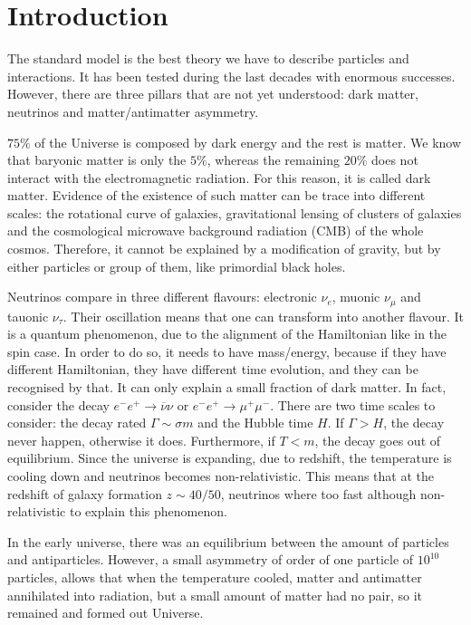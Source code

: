 \chapter*{Introduction}

    The standard model is the best theory we have to describe particles and interactions. It has been tested during the last decades with enormous successes. However, there are three pillars that are not yet understood: dark matter, neutrinos and matter/antimatter asymmetry. 

    $75 \%$ of the Universe is composed by dark energy and the rest is matter. We know that baryonic matter is only the $5\%$, whereas the remaining $20 \%$ does not interact with the electromagnetic radiation. For this reason, it is called dark matter. Evidence of the existence of such matter can be trace into different scales: the rotational curve of galaxies, gravitational lensing of clusters of galaxies and the cosmological microwave background radiation (CMB) of the whole cosmos. Therefore, it cannot be explained by a modification of gravity, but by either particles or group of them, like primordial black holes.

    Neutrinos compare in three different flavours: electronic $\nu_e$, muonic $\nu_\mu$ and tauonic $\nu_\tau$. Their oscillation means that one can transform into another flavour. It is a quantum phenomenon, due to the alignment of the Hamiltonian like in the spin case. In order to do so, it needs to have mass/energy, because if they have different Hamiltonian, they have different time evolution, and they can be recognised by that. It can only explain a small fraction of dark matter. In fact, consider the decay $e^- e^+ \rightarrow \overline \nu \nu$ or $e^- e^+ \rightarrow \mu^+ \mu^-$. There are two time scales to consider: the decay rated $\Gamma \sim \sigma m$ and the Hubble time $H$. If $\Gamma > H$, the decay never happen, otherwise it does. Furthermore, if $T < m$, the decay goes out of equilibrium. Since the universe is expanding, due to redshift, the temperature is cooling down and neutrinos becomes non-relativistic. This means that at the redshift of galaxy formation $z \sim 40/50$, neutrinos where too fast although non-relativistic to explain this phenomenon.

    In the early universe, there was an equilibrium between the amount of particles and antiparticles. However, a small asymmetry of order of one particle of $10^{10}$ particles, allows that when the temperature cooled, matter and antimatter annihilated into radiation, but a small amount of matter had no pair, so it remained and formed out Universe.

